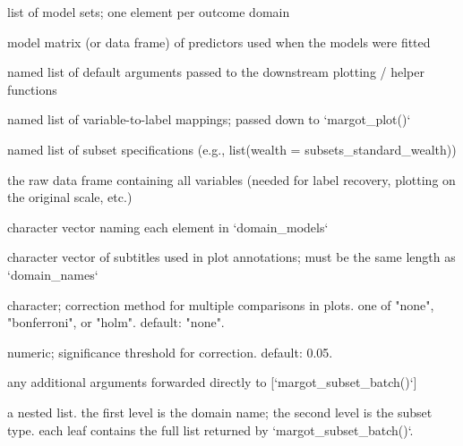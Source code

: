 \documentclass[a4paper]{book}
\begin{document}
\begin{Arguments}
\begin{ldescription}
\item[\code{domain\_models}] list of model sets; one element per outcome domain

\item[\code{X}] model matrix (or data frame) of predictors used when the models were
fitted

\item[\code{base\_defaults}] named list of default arguments passed to the downstream
plotting / helper functions

\item[\code{label\_mapping}] named list of variable-to-label mappings; passed down to `margot\_plot()`

\item[\code{subset\_types}] named list of subset specifications (e.g., list(wealth = subsets\_standard\_wealth))

\item[\code{original\_df}] the raw data frame containing all variables (needed for
label recovery, plotting on the original scale, etc.)

\item[\code{domain\_names}] character vector naming each element in `domain\_models`

\item[\code{subtitles}] character vector of subtitles used in plot annotations;
must be the same length as `domain\_names`

\item[\code{adjust}] character; correction method for multiple comparisons in plots.
one of "none", "bonferroni", or "holm". default: "none".

\item[\code{alpha}] numeric; significance threshold for correction. default: 0.05.

\item[\code{...}] any additional arguments forwarded directly to [`margot\_subset\_batch()`]
\end{ldescription}
\end{Arguments}
%
\begin{Value}
a nested list. the first level is the domain name; the second level
is the subset type. each leaf contains the full list returned by
`margot\_subset\_batch()`.
\end{Value}
%
\end{document}
